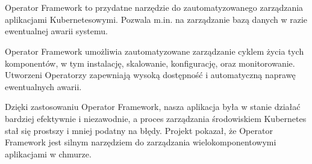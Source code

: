 \documentclass[polish]{aghengthesis}
\renewcommand\lstlistlistingname{\LangListOfListings}
\renewcommand{\lstlistoflistings}{\begingroup
\tocfile{\lstlistlistingname}{lol}
\endgroup}
\begin{document}
\chapter{\ChapterTitleSummary}
\label{sec:podsumowanie}

Operator Framework to przydatne narzędzie do zautomatyzowanego zarządzania aplikacjami Kubernetesowymi. Pozwala m.in. na zarządzanie bazą danych w razie ewentualnej awarii systemu.

Operator Framework umożliwia zautomatyzowane zarządzanie cyklem życia tych komponentów, w tym instalację, skalowanie, konfigurację, oraz monitorowanie. Utworzeni Operatorzy zapewniają wysoką dostępność i automatyczną naprawę ewentualnych awarii.

Dzięki zastosowaniu Operator Framework, nasza aplikacja była w stanie działać bardziej efektywnie i niezawodnie, a proces zarządzania środowiskiem Kubernetes stał się prostszy i mniej podatny na błędy. Projekt pokazał, że Operator Framework jest silnym narzędziem do zarządzania wielokomponentowymi aplikacjami w chmurze.

\listoffigures
\lstlistoflistings
\end{document}
